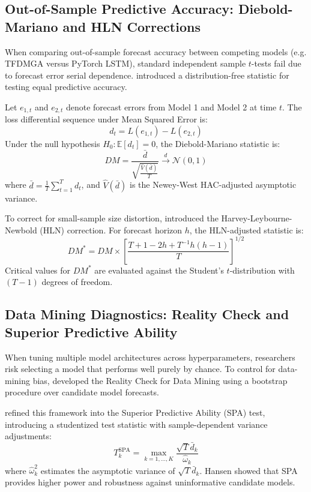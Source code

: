 \subsection{Out-of-Sample Predictive Accuracy: Diebold-Mariano and HLN Corrections}
When comparing out-of-sample forecast accuracy between competing models (e.g. TFDMGA versus PyTorch LSTM), standard independent sample $t$-tests fail due to forecast error serial dependence. \citet{diebold1995comparing} introduced a distribution-free statistic for testing equal predictive accuracy.

Let $e_{1,t}$ and $e_{2,t}$ denote forecast errors from Model 1 and Model 2 at time $t$. The loss differential sequence under Mean Squared Error is:
\begin{equation}
d_t = L(e_{1,t}) - L(e_{2,t})
\label{eq:ch2_loss_diff}
\end{equation}
Under the null hypothesis $H_0: \mathbb{E}[d_t] = 0$, the Diebold-Mariano statistic is:
\begin{equation}
DM = \frac{\bar{d}}{\sqrt{\frac{\widehat{V}(\bar{d})}{T}}} \xrightarrow{d} \mathcal{N}(0, 1)
\label{eq:ch2_dm_stat}
\end{equation}
where $\bar{d} = \frac{1}{T}\sum_{t=1}^T d_t$, and $\widehat{V}(\bar{d})$ is the Newey-West HAC-adjusted asymptotic variance.

To correct for small-sample size distortion, \citet{harvey1997testing} introduced the Harvey-Leybourne-Newbold (HLN) correction. For forecast horizon $h$, the HLN-adjusted statistic is:
\begin{equation}
DM^* = DM \times \left[ \frac{T + 1 - 2h + T^{-1}h(h-1)}{T} \right]^{1/2}
\label{eq:ch2_hln_stat}
\end{equation}
Critical values for $DM^*$ are evaluated against the Student's $t$-distribution with $(T-1)$ degrees of freedom.

\subsection{Data Mining Diagnostics: Reality Check and Superior Predictive Ability}
When tuning multiple model architectures across hyperparameters, researchers risk selecting a model that performs well purely by chance. To control for data-mining bias, \citet{white2000reality} developed the Reality Check for Data Mining using a bootstrap procedure over candidate model forecasts.

\citet{hansen2005superior} refined this framework into the Superior Predictive Ability (SPA) test, introducing a studentized test statistic with sample-dependent variance adjustments:
\begin{equation}
T_k^{\text{SPA}} = \max_{k=1, \dots, K} \frac{\sqrt{T} \bar{d}_k}{\hat{\omega}_k}
\label{eq:ch2_hansen_spa}
\end{equation}
where $\hat{\omega}_k^2$ estimates the asymptotic variance of $\sqrt{T}\bar{d}_k$. Hansen showed that SPA provides higher power and robustness against uninformative candidate models.

